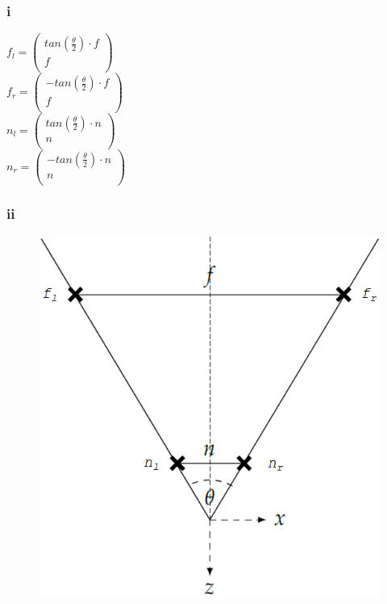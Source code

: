 \documentclass[a4paper,10pt,DIV=14]{article}
\begin{document}
\subsubsection{i}
$f_l= \begin{pmatrix}
tan(\frac{\theta}{2})\cdot f \\
f \\
\end{pmatrix}$ \\
$f_r= \begin{pmatrix}
-tan(\frac{\theta}{2})\cdot f \\
f \\
\end{pmatrix}$ \\
$n_l= \begin{pmatrix}
tan(\frac{\theta}{2})\cdot n \\
n \\
\end{pmatrix}$ \\
$n_r= \begin{pmatrix}
-tan(\frac{\theta}{2})\cdot n \\
n \\
\end{pmatrix}$ 

\subsubsection{ii}

\begin{figure}[!htbp]
	\centering
	\includegraphics[width=1\linewidth]{frustum}
\end{figure}
\end{document}
